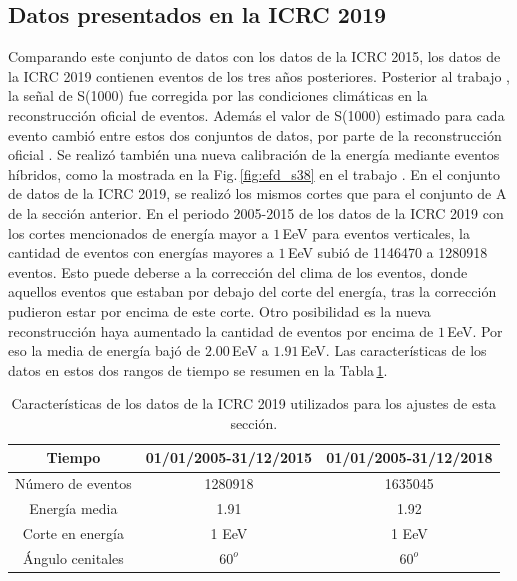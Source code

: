  \subsection{Datos presentados en la ICRC 2019}\label{conjuntoB}
     Comparando este conjunto de datos con los datos de la ICRC 2015, los datos de la ICRC 2019 contienen eventos de los tres años posteriores. Posterior al trabajo \cite{aab2017impact}, la señal de S(1000) fue corregida por las condiciones climáticas en la reconstrucción oficial de eventos. Además el valor de S(1000) estimado para cada evento cambió entre estos dos conjuntos de datos, por parte de la reconstrucción oficial \cite{isabel}. Se realizó también una nueva calibración de la energía mediante eventos híbridos, como la mostrada en la Fig.\,\ref{fig:efd_s38} en el trabajo  \cite{tobepublished}. En el conjunto de datos de la ICRC 2019, se realizó los mismos cortes que para el conjunto de A de la sección anterior. En el periodo 2005-2015 de los datos de la ICRC 2019 con los cortes mencionados de energía mayor a $1\,$EeV para eventos verticales, la cantidad de eventos con energías mayores a $1\,$EeV subió de 1146470 a  1280918 eventos. Esto puede deberse a la corrección del clima de los eventos, donde aquellos eventos que estaban por debajo del corte del energía, tras la corrección pudieron estar por encima de este corte. Otro posibilidad es la nueva reconstrucción haya aumentado la cantidad de eventos por encima de $1\,$EeV. Por eso la media de energía bajó de $2.00\,$EeV a $1.91\,$EeV.  Las características de los datos en estos dos rangos de tiempo se resumen en la Tabla\,\ref{tabla:caracteristicas_ICRC_2019}. 
        \begin{table}[H]
            \centering
            \begin{tabular}{|c|c|c|}
            \hline
            \textbf{Tiempo }    & \textbf{01/01/2005-31/12/2015}  & \textbf{01/01/2005-31/12/2018 }\\ \hline 
            Número de eventos   &  1280918     			 &  1635045     		 \\ \hline 
            Energía media       &  1.91				 &	1.92				\\ \hline %
            Corte en energía    &  1 EeV       		 	 &  1 EeV       		 \\ \hline 
            Ángulo cenitales	&  $60^o$ 				 & $60^o$\\ \hline
            \end{tabular}
            \caption{Características de los datos de la ICRC 2019 utilizados para los ajustes de esta sección.} \label{tabla:caracteristicas_ICRC_2019}
        \end{table}

